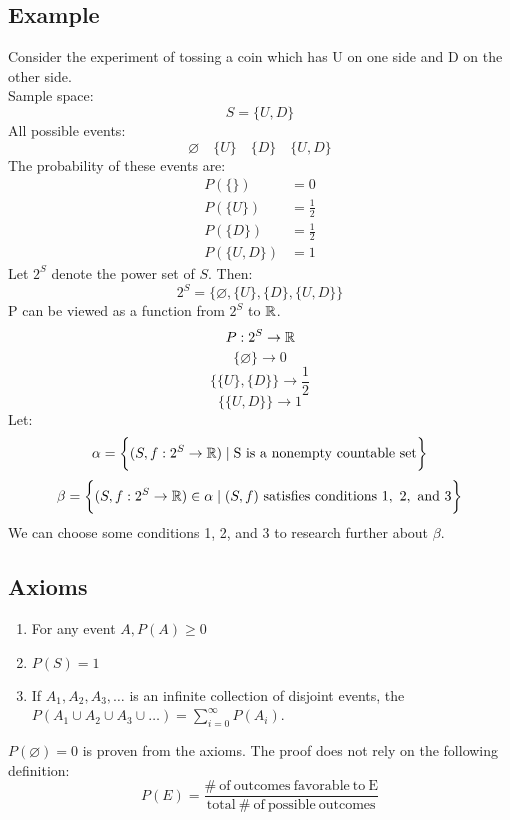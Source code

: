 \documentclass[letterpaper, 12pt]{math}
\begin{document}
\subsection*{Example}
Consider the experiment of tossing a coin which has U on one side and D on the
other side. \\
Sample space:
\[ S = \bigg\{ U, D \bigg\} \]
All possible events:
\[ \varnothing \quad \bigg\{ U \bigg\} \quad \bigg\{ D \bigg\} \quad
   \bigg\{ U, D \bigg\} \]
The probability of these events are:
\begin{align*}
  P(\{ \}) &= 0 \\
  P(\{ U \}) &= \frac{1}{2} \\
  P(\{ D \}) &= \frac{1}{2} \\
  P(\{ U, D \}) &= 1
\end{align*}
Let \( 2^{S} \) denote the power set of \( S \). Then:
\[ 2^{S} = \bigg\{ \varnothing, \{ U \}, \{ D \}, \{ U, D \} \bigg\} \]
P can be viewed as a function from \( 2^{S} \) to \( \mathbb{R} \).
\[ P:2^{S} \to \mathbb{R} \]
\[ \bigg\{ \varnothing \bigg\} \to 0 \]
\[ \bigg\{ \{ U \}, \{ D \} \bigg\} \to \frac{1}{2} \]
\[ \bigg\{ \{ U, D \} \bigg\} \to 1 \]
Let:
\[ \alpha = \bigg\{ (S, f:2^{S} \to \mathbb{R}) \mid \mathrm{S\ is\ a\ nonempty\
   countable\ set} \bigg\} \]
\[ \beta = \bigg\{(S, f:2^{S} \to \mathbb{R}) \in \alpha \mid (S, f)
   \mathrm{\ satisfies\ conditions\ 1,\ 2,\ and\ 3} \bigg\} \]
We can choose some conditions 1, 2, and 3 to research further about
\( \beta \).

\subsection*{Axioms}
\begin{enumerate}
  \item For any event \( A, P(A) \geq 0 \)
  \item \( P(S) = 1 \)
  \item If \( A_{1}, A_{2}, A_{3}, \dots \) is an infinite collection of
    disjoint events, the \( P(A_{1} \cup A_{2} \cup A_{3} \cup \dots) =
    \sum_{i=0}^{\infty}P(A_{i}) \).
\end{enumerate}
\( P(\varnothing) = 0 \) is proven from the axioms. The proof does not rely on
the following definition:
\[ P(E) = \frac{\mathrm{\#\ of\ outcomes\ favorable\ to\ E}}
   {\mathrm{total\ \#\ of\ possible\ outcomes}} \]
\end{document}
